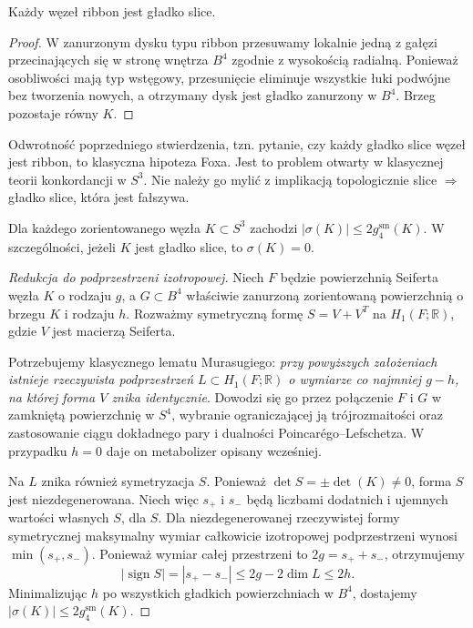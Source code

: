 \begin{stwierdzenie}
Każdy węzeł ribbon jest gładko slice.
\end{stwierdzenie}

\begin{proof}
W zanurzonym dysku typu ribbon przesuwamy lokalnie jedną z gałęzi
przecinających się w stronę wnętrza $B^4$ zgodnie
z wysokością radialną. Ponieważ osobliwości mają typ wstęgowy,
przesunięcie eliminuje wszystkie łuki podwójne bez tworzenia
nowych, a otrzymany dysk jest gładko zanurzony w $B^4$.
Brzeg pozostaje równy $K$.
\end{proof}

\begin{uwaga}
Odwrotność poprzedniego stwierdzenia, tzn. pytanie,
czy każdy gładko slice węzeł jest ribbon, to klasyczna
hipoteza Foxa. Jest to problem otwarty w klasycznej
teorii konkordancji w $S^3$.
Nie należy go mylić z implikacją topologicznie slice
$\Rightarrow$ gładko slice, która jest fałszywa.
\end{uwaga}

\begin{twierdzenie}
Dla każdego zorientowanego węzła $K\subset S^3$
zachodzi $|\sigma(K)|\leq2g_4^{\mathrm{sm}}(K)$.
W szczególności, jeżeli $K$ jest gładko slice, to
$\sigma(K)=0$.
\end{twierdzenie}

\begin{proof}[Redukcja do podprzestrzeni izotropowej]
Niech $F$ będzie powierzchnią Seiferta węzła $K$ o
rodzaju $g$, a $G\subset B^4$ właściwie zanurzoną
zorientowaną powierzchnią o brzegu $K$ i rodzaju $h$.
Rozważmy symetryczną formę $S=V+V^T$ na
$H_1(F;\mathbb R)$, gdzie $V$ jest macierzą Seiferta.

Potrzebujemy klasycznego lematu Murasugiego:
\emph{przy powyższych założeniach istnieje rzeczywista
podprzestrzeń $L\subset H_1(F;\mathbb R)$
o wymiarze co najmniej $g-h$, na której forma $V$
znika identycznie}. Dowodzi się go przez połączenie
$F$ i $G$ w zamkniętą powierzchnię w $S^4$, wybranie
ograniczającej ją trójrozmaitości oraz zastosowanie
ciągu dokładnego pary i dualności Poincarégo--Lefschetza.
W przypadku $h=0$ daje on metabolizer opisany wcześniej.

Na $L$ znika również symetryzacja $S$. Ponieważ
$\det S=\pm\det(K)\ne0$, forma $S$ jest niezdegenerowana. Niech więc
$s_+$ i $s_-$ będą liczbami dodatnich i ujemnych wartości
własnych $S$, dla $S$. Dla niezdegenerowanej rzeczywistej formy symetrycznej
maksymalny wymiar całkowicie izotropowej
podprzestrzeni wynosi $\min(s_+,s_-)$. Ponieważ
wymiar całej przestrzeni to $2g=s_++s_-$, otrzymujemy
\[
|\operatorname{sign}S|=|s_+-s_-|
\le 2g-2\dim L\le2h.
\]
Minimalizując $h$ po wszystkich gładkich powierzchniach
w $B^4$, dostajemy $|\sigma(K)|\le2g_4^{\mathrm{sm}}(K)$.
\end{proof}

